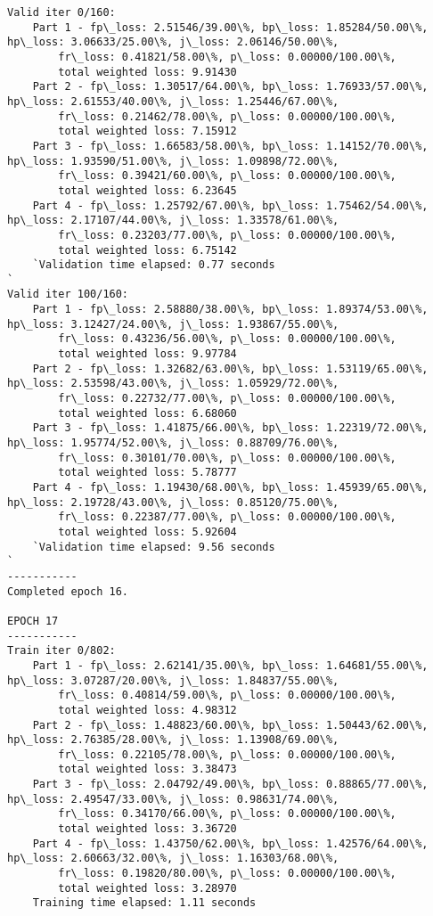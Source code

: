 \documentclass[11pt]{article}
\begin{document}
\begin{Verbatim}[commandchars=\\\{\}]
Valid iter 0/160:
	Part 1 - fp\_loss: 2.51546/39.00\%, bp\_loss: 1.85284/50.00\%, hp\_loss: 3.06633/25.00\%, j\_loss: 2.06146/50.00\%, 
		fr\_loss: 0.41821/58.00\%, p\_loss: 0.00000/100.00\%, 
		total weighted loss: 9.91430
	Part 2 - fp\_loss: 1.30517/64.00\%, bp\_loss: 1.76933/57.00\%, hp\_loss: 2.61553/40.00\%, j\_loss: 1.25446/67.00\%, 
		fr\_loss: 0.21462/78.00\%, p\_loss: 0.00000/100.00\%, 
		total weighted loss: 7.15912
	Part 3 - fp\_loss: 1.66583/58.00\%, bp\_loss: 1.14152/70.00\%, hp\_loss: 1.93590/51.00\%, j\_loss: 1.09898/72.00\%, 
		fr\_loss: 0.39421/60.00\%, p\_loss: 0.00000/100.00\%, 
		total weighted loss: 6.23645
	Part 4 - fp\_loss: 1.25792/67.00\%, bp\_loss: 1.75462/54.00\%, hp\_loss: 2.17107/44.00\%, j\_loss: 1.33578/61.00\%, 
		fr\_loss: 0.23203/77.00\%, p\_loss: 0.00000/100.00\%, 
		total weighted loss: 6.75142
	`Validation time elapsed: 0.77 seconds
`
Valid iter 100/160:
	Part 1 - fp\_loss: 2.58880/38.00\%, bp\_loss: 1.89374/53.00\%, hp\_loss: 3.12427/24.00\%, j\_loss: 1.93867/55.00\%, 
		fr\_loss: 0.43236/56.00\%, p\_loss: 0.00000/100.00\%, 
		total weighted loss: 9.97784
	Part 2 - fp\_loss: 1.32682/63.00\%, bp\_loss: 1.53119/65.00\%, hp\_loss: 2.53598/43.00\%, j\_loss: 1.05929/72.00\%, 
		fr\_loss: 0.22732/77.00\%, p\_loss: 0.00000/100.00\%, 
		total weighted loss: 6.68060
	Part 3 - fp\_loss: 1.41875/66.00\%, bp\_loss: 1.22319/72.00\%, hp\_loss: 1.95774/52.00\%, j\_loss: 0.88709/76.00\%, 
		fr\_loss: 0.30101/70.00\%, p\_loss: 0.00000/100.00\%, 
		total weighted loss: 5.78777
	Part 4 - fp\_loss: 1.19430/68.00\%, bp\_loss: 1.45939/65.00\%, hp\_loss: 2.19728/43.00\%, j\_loss: 0.85120/75.00\%, 
		fr\_loss: 0.22387/77.00\%, p\_loss: 0.00000/100.00\%, 
		total weighted loss: 5.92604
	`Validation time elapsed: 9.56 seconds
`
-----------
Completed epoch 16.

EPOCH 17
-----------
Train iter 0/802:
	Part 1 - fp\_loss: 2.62141/35.00\%, bp\_loss: 1.64681/55.00\%, hp\_loss: 3.07287/20.00\%, j\_loss: 1.84837/55.00\%, 
		fr\_loss: 0.40814/59.00\%, p\_loss: 0.00000/100.00\%, 
		total weighted loss: 4.98312
	Part 2 - fp\_loss: 1.48823/60.00\%, bp\_loss: 1.50443/62.00\%, hp\_loss: 2.76385/28.00\%, j\_loss: 1.13908/69.00\%, 
		fr\_loss: 0.22105/78.00\%, p\_loss: 0.00000/100.00\%, 
		total weighted loss: 3.38473
	Part 3 - fp\_loss: 2.04792/49.00\%, bp\_loss: 0.88865/77.00\%, hp\_loss: 2.49547/33.00\%, j\_loss: 0.98631/74.00\%, 
		fr\_loss: 0.34170/66.00\%, p\_loss: 0.00000/100.00\%, 
		total weighted loss: 3.36720
	Part 4 - fp\_loss: 1.43750/62.00\%, bp\_loss: 1.42576/64.00\%, hp\_loss: 2.60663/32.00\%, j\_loss: 1.16303/68.00\%, 
		fr\_loss: 0.19820/80.00\%, p\_loss: 0.00000/100.00\%, 
		total weighted loss: 3.28970
	Training time elapsed: 1.11 seconds


\end{Verbatim}
\end{document}
